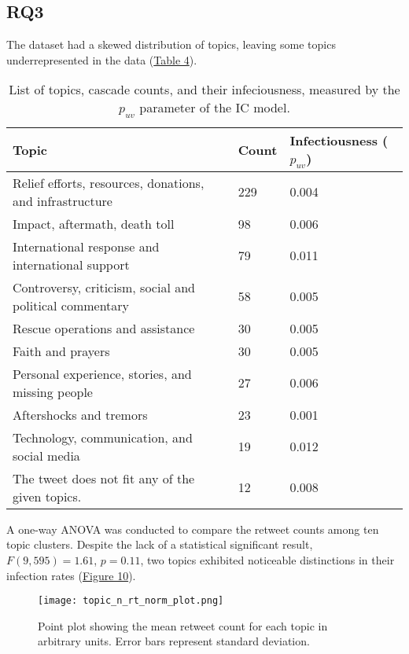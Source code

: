 \documentclass[11pt,a4paper]{article}
\begin{document}
    \subsection{RQ3}
        The dataset had a skewed distribution of topics, leaving some topics underrepresented in the data (\hyperlink{fig:topic-dist}{Table 4}).
        
        \begin{table}[h]
        \hypertarget{fig:topic-dist}{}
        \centering
        \begin{tabular}{|l|l|l|}
            \hline
            \textbf{Topic} & \textbf{Count} & \textbf{Infectiousness ($p_{uv}$)} \\
            \hline
            Relief efforts, resources, donations, and infrastructure & 229 & 0.004 \\
            Impact, aftermath, death toll & 98 & 0.006 \\
            International response and international support & 79 & 0.011 \\
            Controversy, criticism, social and political commentary & 58 & 0.005 \\
            Rescue operations and assistance & 30 & 0.005 \\
            Faith and prayers & 30 & 0.005 \\
            Personal experience, stories, and missing people & 27 & 0.006 \\
            Aftershocks and tremors & 23 & 0.001 \\
            Technology, communication, and social media & 19 & 0.012 \\
            The tweet does not fit any of the given topics. & 12 & 0.008 \\
            \hline
        \end{tabular}
        \caption{List of topics, cascade counts, and their infeciousness, measured by the $p_{uv}$ parameter of the IC model.}
        \end{table}
    
        A one-way ANOVA was conducted to compare the retweet counts among ten topic clusters. Despite the lack of a statistical significant result, $F (9, 595) = 1.61$, $p = 0.11$, two topics exhibited noticeable distinctions in their infection rates (\hyperlink{fig:topic-comp}{Figure 10}). 
    
        \begin{figure}[H]
            \hypertarget{fig:topic-comp}{}
            \centering
            \texttt{[image: topic\_n\_rt\_norm\_plot.png]}\\
            \caption{Point plot showing the mean retweet count for each topic in arbitrary units. Error bars represent standard deviation.}        
            \label{fig:enter-label}
        \end{figure}
    
\end{document}
